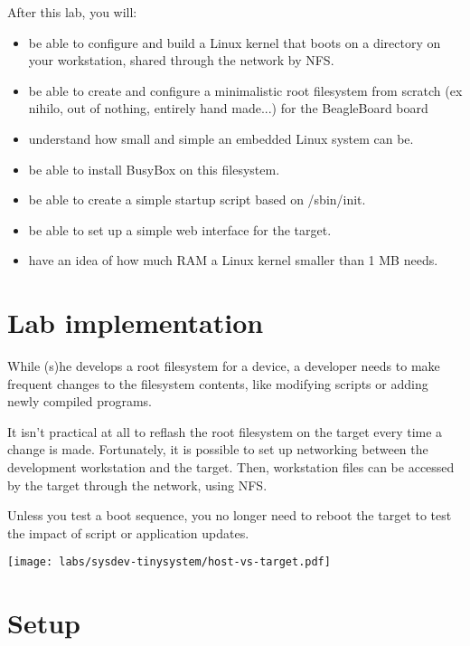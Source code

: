 
After this lab, you will:
\begin{itemize}
\item be able to configure and build a Linux kernel that boots on a
  directory on your workstation, shared through the network by NFS.
\item be able to create and configure a minimalistic root filesystem
  from scratch (ex nihilo, out of nothing, entirely hand made...) for
  the BeagleBoard board
\item understand how small and simple an embedded Linux system can be.
\item be able to install BusyBox on this filesystem.
\item be able to create a simple startup script based on /sbin/init.
\item be able to set up a simple web interface for the target.
\item have an idea of how much RAM a Linux kernel smaller than 1 MB needs.
\end{itemize}

\section{Lab implementation}

While (s)he develops a root filesystem for a device, a developer needs
to make frequent changes to the filesystem contents, like modifying
scripts or adding newly compiled programs.

It isn't practical at all to reflash the root filesystem on the target
every time a change is made. Fortunately, it is possible to set up
networking between the development workstation and the target. Then,
workstation files can be accessed by the target through the network,
using NFS.

Unless you test a boot sequence, you no longer need to reboot the
target to test the impact of script or application updates.

\begin{center}
\texttt{[image: labs/sysdev-tinysystem/host-vs-target.pdf]}
\end{center}

\section{Setup}

